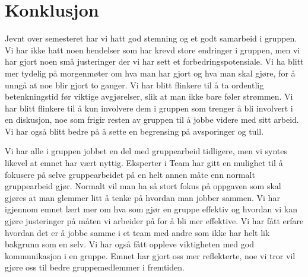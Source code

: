 
\chapter{Konklusjon} %

\label{ch:konklusjon} %




Jevnt over semesteret har vi hatt god stemning og et godt sam\-arbeid i gruppen. Vi har ikke hatt noen hendelser som har krevd store endringer i gruppen, men vi har gjort noen små justeringer der vi har sett et forbedringspotensiale. Vi ha blitt mer tydelig på morgenmøter om hva man har gjort og hva man skal gjøre, for å unngå at noe blir gjort to ganger. Vi har blitt flinkere til å ta ordentlig betenkningstid før viktige avgjørelser, slik at man ikke bare føler strømmen. Vi har blitt flinkere til å kun involvere dem i gruppen som trenger å bli involvert i en diskusjon, noe som frigir resten av gruppen til å jobbe videre med sitt arbeid. Vi har også blitt bedre på å sette en begrensing på avsporinger og tull.

Vi har alle i gruppen jobbet en del med gruppearbeid tidligere, men vi syntes likevel at emnet har vært nyttig. Eksperter i Team har gitt en mulighet til å fokusere på selve gruppearbeidet på en helt annen måte enn normalt gruppearbeid gjør. Normalt vil man ha så stort fokus på oppgaven som skal gjøres at man glemmer litt å tenke på hvordan man jobber sammen. Vi har igjennom emnet lært mer om hva som gjør en gruppe effektiv og hvordan vi kan gjøre justeringer på måten vi arbeider på for å bli mer effektive. Vi har fått erfare hvordan det er å jobbe samme i et team med andre som ikke har helt lik bakgrunn som en selv. Vi har også fått oppleve viktigheten med god kommunikasjon i en gruppe. Emnet har gjort oss mer reflekterte, noe vi tror vil gjøre oss til bedre gruppemedlemmer i fremtiden. 